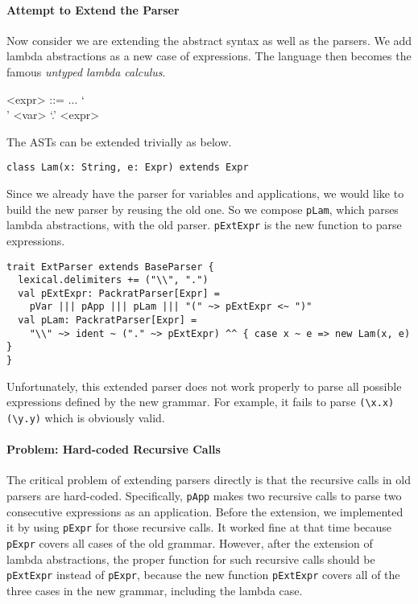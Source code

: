 \paragraph{Attempt to Extend the Parser} Now consider we are extending the abstract syntax as well as the parsers. We add lambda abstractions as a new case of expressions. The language then becomes the famous \textit{untyped lambda calculus}.

\setlength{\grammarindent}{5em}
\begin{grammar}
<expr> ::= ...
    \alt `\\' <var> `.' <expr>
\end{grammar}

The ASTs can be extended trivially as below.

\begin{lstlisting}
class Lam(x: String, e: Expr) extends Expr
\end{lstlisting}

Since we already have the parser for variables and applications, we would like to build the new parser by reusing the old one. So we compose \lstinline{pLam}, which parses lambda abstractions, with the old parser. \lstinline{pExtExpr} is the new function to parse expressions.

\begin{lstlisting}
trait ExtParser extends BaseParser {
  lexical.delimiters += ("\\", ".")
  val pExtExpr: PackratParser[Expr] =
    pVar ||| pApp ||| pLam ||| "(" ~> pExtExpr <~ ")"
  val pLam: PackratParser[Expr] =
    "\\" ~> ident ~ ("." ~> pExtExpr) ^^ { case x ~ e => new Lam(x, e) }
}
\end{lstlisting}

Unfortunately, this extended parser does not work properly to parse all possible expressions defined by the new grammar. For example, it fails to parse \lstinline{(\x.x)} \lstinline{(\y.y)} which is obviously valid.

\paragraph{Problem: Hard-coded Recursive Calls} The critical problem of extending parsers directly is that the recursive calls in old parsers are hard-coded. Specifically, \lstinline{pApp} makes two recursive calls to parse two consecutive expressions as an application. Before the extension, we implemented it by using \lstinline{pExpr} for those recursive calls. It worked fine at that time because \lstinline{pExpr} covers all cases of the old grammar. However, after the extension of lambda abstractions, the proper function for such recursive calls should be \lstinline{pExtExpr} instead of \lstinline{pExpr}, because the new function \lstinline{pExtExpr} covers all of the three cases in the new grammar, including the lambda case.

